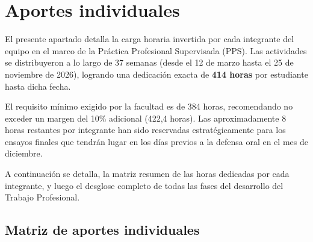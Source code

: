 \section{Aportes individuales}

El presente apartado detalla la carga horaria invertida por cada integrante del equipo en el marco de la Práctica Profesional Supervisada (PPS). Las actividades se distribuyeron a lo largo de 37 semanas (desde el 12 de marzo hasta el 25 de noviembre de 2026), logrando una dedicación exacta de \textbf{414 horas} por estudiante hasta dicha fecha. 

El requisito mínimo exigido por la facultad es de 384 horas, recomendando no exceder un margen del 10\% adicional (422,4 horas). Las aproximadamente 8 horas restantes por integrante han sido reservadas estratégicamente para los ensayos finales que tendrán lugar en los días previos a la defensa oral en el mes de diciembre.

A continuación se detalla, la matriz resumen de las horas dedicadas por cada integrante, y luego el desglose completo de todas las fases del desarrollo del Trabajo Profesional.

\subsection{Matriz de aportes individuales}

